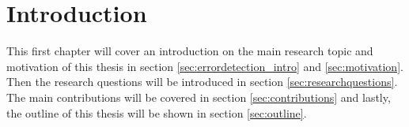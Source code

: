 \chapter{Introduction}
\label{chap:introduction}
This first chapter will cover an introduction on the main research topic and motivation of this thesis in section \ref{sec:errordetection_intro} and \ref{sec:motivation}. Then the research questions will be introduced in section \ref{sec:researchquestions}. The main contributions will be covered in section \ref{sec:contributions} and lastly, the outline of this thesis will be shown in section \ref{sec:outline}.



